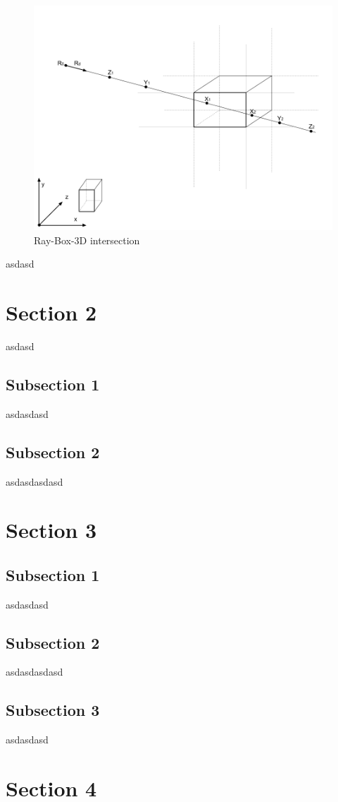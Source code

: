 \begin{figure}[H]\label{fig:ray-box-3d}
\centering
\includegraphics[width=\linewidth]{Figures/ray-box-3d-intersection.png}
\decoRule
\caption[ray-box-3d-intersection]{Ray-Box-3D intersection}
\end{figure}

asdasd



\section{Section 2}
asdasd

\subsection{Subsection 1}
asdasdasd

\subsection{Subsection 2}
asdasdasdasd

\section{Section 3}

\subsection{Subsection 1}
asdasdasd

\subsection{Subsection 2}
asdasdasdasd

\subsection{Subsection 3}
asdasdasd

\section{Section 4}

